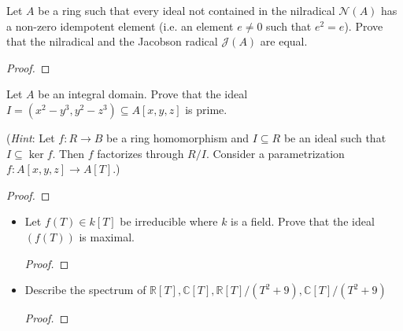 \begin{problem}
    Let $A$ be a ring such that every ideal not contained in the nilradical $\mathcal{N}(A)$ has a non-zero idempotent element (i.e. an element $e \neq 0$ such that $e^2 = e$).
    Prove that the nilradical and the Jacobson radical $\mathcal{J}(A)$ are equal.
    \begin{sol}
        \begin{proof}
        \end{proof}
    \end{sol}
\end{problem}

\begin{problem}
    Let $A$ be an integral domain.
    Prove that the ideal $I = (x^2 - y^3, y^2 - z^3) \subseteq A[x,y,z]$ is prime.

    (\textit{Hint}: Let $f:R \rightarrow B$ be a ring homomorphism and $I \subseteq R$ be an ideal such that $I \subseteq \ker f$.
    Then $f$ factorizes through $R/I$.
    Consider a parametrization $f: A[x,y,z] \rightarrow A[T]$.)
    \begin{sol}
        \begin{proof}
        \end{proof}
    \end{sol}
\end{problem}

\begin{problem}
    \begin{itemize}
        \item Let $f(T) \in k[T]$ be irreducible where $k$ is a field.
        Prove that the ideal $(f(T))$ is maximal.
            \begin{sol}
                \begin{proof}
                \end{proof}
            \end{sol}
        \item Describe the spectrum of $\mathbb{R}[T], \mathbb{C}[T], \mathbb{R}[T]/(T^2+9), \mathbb{C}[T]/(T^2+9)$
            \begin{sol}
                \begin{proof}
                \end{proof}
            \end{sol}
    \end{itemize}
\end{problem}